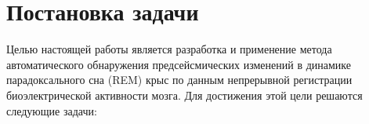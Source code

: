 \documentclass[14pt]{mmcs_article}
\begin{document}

\renewcommand{\contentsname}{Оглавление}

\tableofcontents

\newpage
{}

\section*{Постановка задачи}

Целью настоящей работы является разработка и применение метода
автоматического обнаружения предсейсмических изменений в
динамике парадоксального сна (REM) крыс по данным непрерывной
регистрации биоэлектрической активности мозга. Для достижения
этой цели решаются следующие задачи:
\end{document}
